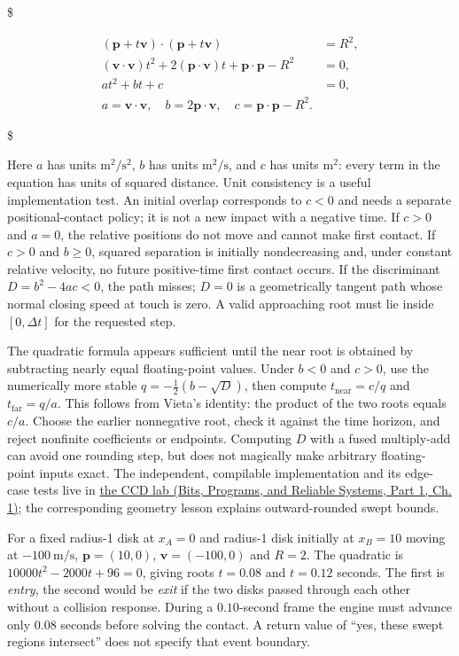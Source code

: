 \$

\[\begin{aligned}
(\mathbf p+t\mathbf v)\cdot(\mathbf p+t\mathbf v)&=R^2,\\
(\mathbf v\cdot\mathbf v)t^2+2(\mathbf p\cdot\mathbf v)t
+\mathbf p\cdot\mathbf p-R^2&=0,\\
at^2+bt+c&=0,\\
a=\mathbf v\cdot\mathbf v,\quad
b=2\mathbf p\cdot\mathbf v,\quad
c=\mathbf p\cdot\mathbf p-R^2.&
\end{aligned}\]

\$

Here \(a\) has units \(\mathrm{m}^2/\mathrm{s}^2\), \(b\) has units \(\mathrm{m}^2/\mathrm{s}\), and \(c\) has units \(\mathrm{m}^2\): every term in the equation has units of squared distance. Unit consistency is a useful implementation test. An initial overlap corresponds to \(c<0\) and needs a separate positional-contact policy; it is not a new impact with a negative time. If \(c>0\) and \(a=0\), the relative positions do not move and cannot make first contact. If \(c>0\) and \(b\ge0\), squared separation is initially nondecreasing and, under constant relative velocity, no future positive-time first contact occurs. If the discriminant \(D=b^2-4ac<0\), the path misses; \(D=0\) is a geometrically tangent path whose normal closing speed at touch is zero. A valid approaching root must lie inside \([0,\Delta t]\) for the requested step.

The quadratic formula appears sufficient until the near root is obtained by subtracting nearly equal floating-point values. Under \(b<0\) and \(c>0\), use the numerically more stable \(q=-\tfrac12(b-\sqrt D)\), then compute \(t_{\mathrm{near}}=c/q\) and \(t_{\mathrm{far}}=q/a\). This follows from Vieta's identity: the product of the two roots equals \(c/a\). Choose the earlier nonnegative root, check it against the time horizon, and reject nonfinite coefficients or endpoints. Computing \(D\) with a fused multiply-add can avoid one rounding step, but does not magically make arbitrary floating-point inputs exact. The independent, compilable implementation and its edge-case tests live in \href{../01-Bits-Programs-and-Reliable-Systems-P01/main.pdf\#source-file-887bbb1db2a031cbbf1eee43}{the CCD lab (Bits, Programs, and Reliable Systems, Part 1, Ch. 1)}; the corresponding geometry lesson explains outward-rounded swept bounds.

For a fixed radius-1 disk at \(x_A=0\) and radius-1 disk initially at \(x_B=10\) moving at \(-100\ \mathrm{m/s}\), \(\mathbf p=(10,0)\), \(\mathbf v=(-100,0)\) and \(R=2\). The quadratic is \(10000t^2-2000t+96=0\), giving roots \(t=0.08\) and \(t=0.12\) seconds. The first is \emph{entry}, the second would be \emph{exit} if the two disks passed through each other without a collision response. During a \(0.10\)-second frame the engine must advance only \(0.08\) seconds before solving the contact. A return value of ``yes, these swept regions intersect'' does not specify that event boundary.

